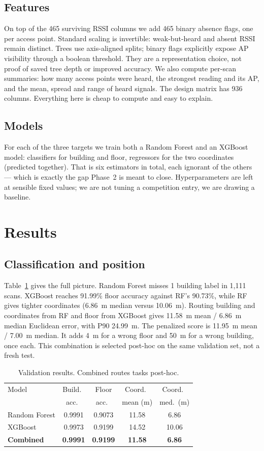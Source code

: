 \documentclass[conference]{IEEEtran}
\begin{document}
\subsection{Features}
On top of the 465 surviving RSSI columns we add 465 binary absence flags, one
per access point. Standard scaling is invertible: weak-but-heard and absent RSSI
remain distinct. Trees use axis-aligned splits; binary flags explicitly expose
AP visibility through a boolean threshold. They are a representation choice, not
proof of saved tree depth or improved accuracy. We also compute per-scan
summaries: how many access points were heard, the strongest reading and its AP,
and the mean, spread and range of heard signals. The design matrix has 936
columns. Everything here is cheap to compute and easy to explain.

\subsection{Models}
For each of the three targets we train both a Random Forest and an XGBoost
model: classifiers for building and floor, regressors for the two coordinates
(predicted together). That is six estimators in total, each ignorant of the
others --- which is exactly the gap Phase~2 is meant to close. Hyperparameters
are left at sensible fixed values; we are not tuning a competition entry, we are
drawing a baseline.

\section{Results}
\subsection{Classification and position}
Table~\ref{tab:main} gives the full picture. Random Forest misses 1 building label
in 1{,}111 scans. XGBoost reaches 91.99\% floor accuracy against RF's 90.73\%,
while RF gives tighter coordinates (6.86~m median versus 10.06~m). Routing
building and coordinates from RF and floor from XGBoost gives 11.58~m mean /
6.86~m median Euclidean error, with P90 24.99~m. The penalized score is 11.95~m
mean / 7.00~m median. It adds 4~m for a wrong floor and 50~m for a wrong
building, once each. This combination is selected post-hoc on the same validation
set, not a fresh test.

\begin{table}[t]
\caption{Validation results. Combined routes tasks post-hoc.}
\label{tab:main}
\centering
\small
\begin{tabular}{lcccc}
\toprule
Model & Build.\ & Floor & Coord.\ & Coord.\ \\
      & acc.\   & acc.\ & mean (m) & med.\ (m) \\
\midrule
Random Forest        & 0.9991 & 0.9073 & 11.58 & 6.86 \\
XGBoost              & 0.9973 & 0.9199 & 14.52 & 10.06 \\
\textbf{Combined}    & \textbf{0.9991} & \textbf{0.9199} & \textbf{11.58} & \textbf{6.86} \\
\bottomrule
\end{tabular}
\end{table}
\end{document}
